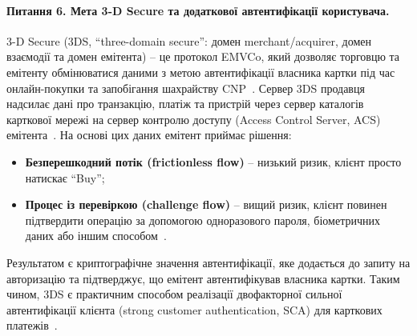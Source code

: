 \paragraph{Питання 6. Мета 3-D Secure та додаткової автентифікації користувача.}
3-D Secure (3DS, \enquote{three-domain secure}: домен merchant/acquirer, домен взаємодії та домен емітента) -- це 
протокол EMVCo, який дозволяє торговцю та емітенту обмінюватися даними з метою автентифікації власника картки під 
час онлайн-покупки та запобігання шахрайству CNP~\cite{emv_3ds}. Сервер 3DS продавця надсилає дані про транзакцію, 
платіж та пристрій через сервер каталогів карткової мережі на сервер контролю доступу (Access Control Server, ACS) 
емітента~\cite{emv_3ds_whitepaper}. На основі цих даних емітент приймає рішення:
\begin{itemize}[noitemsep]
    \item \textbf{Безперешкодний потік (frictionless flow)} -- низький ризик, клієнт просто натискає \enquote{Buy};
    \item \textbf{Процес із перевіркою (challenge flow)} -- вищий ризик, клієнт повинен підтвердити операцію за 
        допомогою одноразового пароля, біометричних даних або іншим способом~\cite{emv_3ds}.
\end{itemize}
Результатом є криптографічне значення автентифікації, яке додається до запиту на авторизацію та підтверджує,
що емітент автентифікував власника картки. Таким чином, 3DS є практичним способом реалізації двофакторної
сильної автентифікації клієнта (strong customer authentication, SCA) для карткових платежів~\cite{emv_3ds}.

